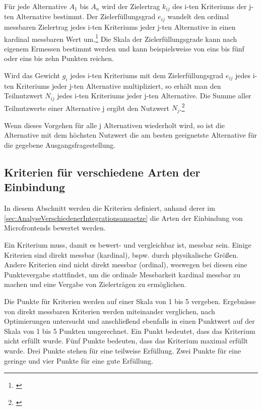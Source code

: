 Für jede Alternative $A_1$ bis $A_n$ wird der Zielertrag $k_{ij}$ des i-ten Kriteriums der j-ten Alternative bestimmt. Der Zielerfüllungsgrad $e_{ij}$ wandelt den ordinal messbaren Zielertrag jedes i-ten Kriteriums jeder j-ten Alternative in einen kardinal messbaren Wert um.\footnote{\cite[vgl.][29]{Bechmann1978}}  Die Skala der Zielerfüllungsgrade kann nach eigenem Ermessen bestimmt werden und kann beispielsweise von eins bis fünf oder eins bis zehn Punkten reichen.

Wird das Gewicht $g_i$ jedes i-ten Kriteriums mit dem Zielerfüllungsgrad $e_{ij}$ jedes i-ten Kriteriums jeder j-ten Alternative multipliziert, so erhält man den Teilnutzwert $N_{ij}$ jedes i-ten Kriteriums jeder j-ten Alternative. Die Summe aller Teilnutzwerte einer Alternative j ergibt den Nutzwert $N_j$.\footnote{\cite[vgl.][29]{Bechmann1978}}

Wenn dieses Vorgehen für alle j Alternativen wiederholt wird, so ist die Alternative mit dem höchsten Nutzwert die am besten geeignetste Alternative für die gegebene Ausgangsfragestellung.

\subsection{Kriterien für verschiedene Arten der Einbindung}\label{sec:KriterienArtenEinbindung}

In diesem Abschnitt werden die Kriterien definiert, anhand derer im \cref{sec:AnalyseVerschiedenerIntegrationsansaetze} die Arten der Einbindung von Microfrontends bewertet werden.

Ein Kriterium muss, damit es bewert- und vergleichbar ist, messbar sein. Einige Kriterien sind direkt messbar (kardinal), bspw. durch physikalische Größen. Andere Kriterien sind nicht direkt messbar (ordinal), weswegen bei diesen eine Punktevergabe stattfindet, um die ordinale Messbarkeit kardinal messbar zu machen und eine Vergabe von Zielerträgen zu ermöglichen.

Die Punkte für Kriterien werden auf einer Skala von 1 bis 5 vergeben. Ergebnisse von direkt messbaren Kriterien werden miteinander verglichen, nach Optimierungen untersucht und anschließend ebenfalls in einen Punktwert auf der Skala von 1 bis 5 Punkten umgerechnet. Ein Punkt bedeutet, dass das Kriterium nicht erfüllt wurde. Fünf Punkte bedeuten, dass das Kriterium maximal erfüllt wurde. Drei Punkte stehen für eine teilweise Erfüllung. Zwei Punkte für eine geringe und vier Punkte für eine gute Erfüllung.

